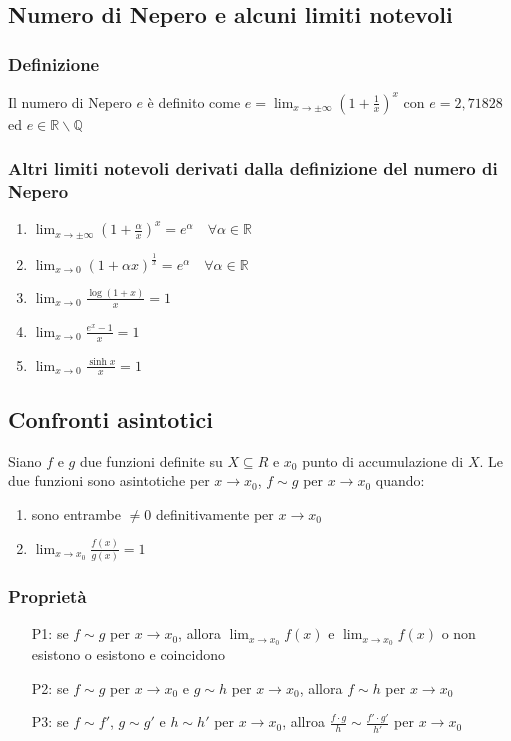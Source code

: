 \documentclass[a4paper]{article}
\begin{document}
\subsection{Numero di Nepero e alcuni limiti notevoli}
\subsubsection*{Definizione}
Il numero di Nepero \(e\) è definito come \(\displaystyle e = \lim_{x \to \pm \infty} \left( 1 + \frac{1}{x} \right) ^ x\)
con \(e = 2,71828\) ed \(e \in \mathbb{R} \backslash \mathbb{Q}\)

\subsubsection*{Altri limiti notevoli derivati dalla definizione del numero di Nepero}
\begin{enumerate}
	\item \(\displaystyle \lim_{x \to \pm \infty} \left(1 + \frac{\alpha}{x} \right) ^ x = e ^ \alpha \quad \forall \alpha \in \mathbb{R}\)
	\item \(\displaystyle \lim_{x \to 0} \left( 1 + \alpha x \right) ^ \frac{1}{x} = e ^ \alpha \quad \forall \alpha \in \mathbb{R}\)
	\item \(\displaystyle \lim_{x \to 0} \frac{\log \left( 1 + x \right)}{x} = 1\)
	\item \(\displaystyle \lim_{x \to 0} \frac{ e ^ x - 1 }{x} = 1\)
	\item \(\displaystyle \lim_{x \to 0} \frac{\sinh x}{x} = 1\)
\end{enumerate}

\subsection{Confronti asintotici}
Siano \(f\) e \(g\) due funzioni definite su \(X \subseteq R\) e \(x_0\) punto di accumulazione di \(X\). Le due funzioni sono asintotiche per \(x \to x_0\),
\(f \sim g\) per \(x \to x_0\) quando:
\begin{enumerate}
	\item sono entrambe \(\neq 0\) definitivamente per \(x \to x_0\)
	\item \(\displaystyle \lim_{x \to x_0} \frac{f(x)}{g(x)} = 1\)
\end{enumerate}

\subsubsection*{Proprietà}
\begin{itemize}
	\item[P1:] se \(f \sim g\) per \(x \to x_0\), allora \(\lim_{x \to x_0} f(x)\) e \(\lim_{x \to x_0} f(x)\) o non esistono o esistono e coincidono
	\item[P2:] se \(f \sim g\) per \(x \to x_0\) e \(g \sim h\) per \(x \to x_0\), allora \(f \sim h\) per \(x \to x_0\)
	\item[P3:] se \(f \sim f'\), \(g \sim g'\) e \(h \sim h'\) per \(x \to x_0\), allroa \(\displaystyle \frac{f \cdot g}{h} \sim \frac{f' \cdot g'}{h'}\) per \(x \to x_0\)
\end{itemize}
\end{document}
